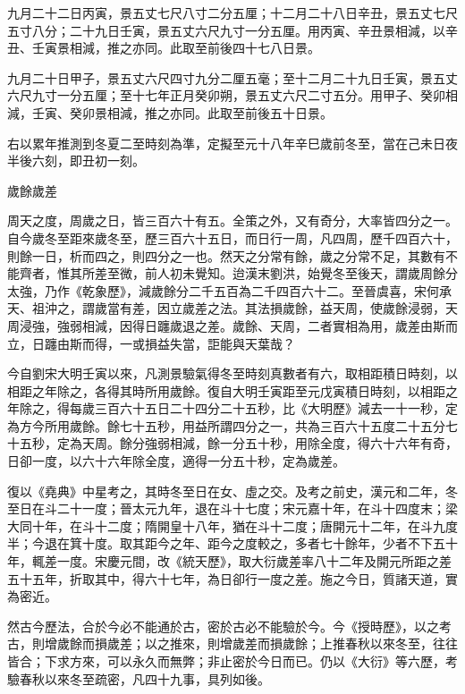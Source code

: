 \begin{pinyinscope}
 九月二十二日丙寅，景五丈七尺八寸二分五厘；十二月二十八日辛丑，景五丈七尺五寸八分；二十九日壬寅，景五丈六尺九寸一分五厘。用丙寅、辛丑景相減，以辛丑、壬寅景相減，推之亦同。此取至前後四十七八日景。



 九月二十日甲子，景五丈六尺四寸九分二厘五毫；至十二月二十九日壬寅，景五丈六尺九寸一分五厘；至十七年正月癸卯朔，景五丈六尺二寸五分。用甲子、癸卯相減，壬寅、癸卯景相減，推之亦同。此取至前後五十日景。



 右以累年推測到冬夏二至時刻為準，定擬至元十八年辛巳歲前冬至，當在己未日夜半後六刻，即丑初一刻。



 歲餘歲差



 周天之度，周歲之日，皆三百六十有五。全策之外，又有奇分，大率皆四分之一。自今歲冬至距來歲冬至，歷三百六十五日，而日行一周，凡四周，歷千四百六十，則餘一日，析而四之，則四分之一也。然天之分常有餘，歲之分常不足，其數有不能齊者，惟其所差至微，前人初未覺知。迨漢末劉洪，始覺冬至後天，謂歲周餘分太強，乃作《乾象歷》，減歲餘分二千五百為二千四百六十二。至晉虞喜，宋何承天、祖沖之，謂歲當有差，因立歲差之法。其法損歲餘，益天周，使歲餘浸弱，天周浸強，強弱相減，因得日躔歲退之差。歲餘、天周，二者實相為用，歲差由斯而立，日躔由斯而得，一或損益失當，詎能與天葉哉？



 今自劉宋大明壬寅以來，凡測景驗氣得冬至時刻真數者有六，取相距積日時刻，以相距之年除之，各得其時所用歲餘。復自大明壬寅距至元戊寅積日時刻，以相距之年除之，得每歲三百六十五日二十四分二十五秒，比《大明歷》減去一十一秒，定為方今所用歲餘。餘七十五秒，用益所謂四分之一，共為三百六十五度二十五分七十五秒，定為天周。餘分強弱相減，餘一分五十秒，用除全度，得六十六年有奇，日卻一度，以六十六年除全度，適得一分五十秒，定為歲差。



 復以《堯典》中星考之，其時冬至日在女、虛之交。及考之前史，漢元和二年，冬至日在斗二十一度；晉太元九年，退在斗十七度；宋元嘉十年，在斗十四度末；梁大同十年，在斗十二度；隋開皇十八年，猶在斗十二度；唐開元十二年，在斗九度半；今退在箕十度。取其距今之年、距今之度較之，多者七十餘年，少者不下五十年，輒差一度。宋慶元間，改《統天歷》，取大衍歲差率八十二年及開元所距之差五十五年，折取其中，得六十七年，為日卻行一度之差。施之今日，質諸天道，實為密近。



 然古今歷法，合於今必不能通於古，密於古必不能驗於今。今《授時歷》，以之考古，則增歲餘而損歲差；以之推來，則增歲差而損歲餘；上推春秋以來冬至，往往皆合；下求方來，可以永久而無弊；非止密於今日而已。仍以《大衍》等六歷，考驗春秋以來冬至疏密，凡四十九事，具列如後。




\end{pinyinscope}
